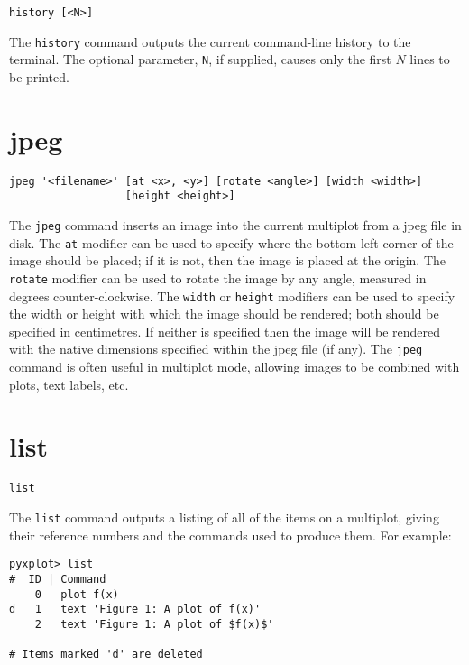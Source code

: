\begin{verbatim}
history [<N>]
\end{verbatim}

The {\tt history} command outputs the current command-line history to the
terminal.  The optional parameter, {\tt N}, if supplied, causes only the first
$N$ lines to be printed.

\section{jpeg}

\begin{verbatim}
jpeg '<filename>' [at <x>, <y>] [rotate <angle>] [width <width>]
                  [height <height>]
\end{verbatim}

The {\tt jpeg} command inserts an image into the current multiplot from a jpeg
file in disk.  The {\tt at} modifier can be used to specify where the
bottom-left corner of the image should be placed; if it is not, then the image
is placed at the origin. The {\tt rotate} modifier can be used to rotate the
image by any angle, measured in degrees counter-clockwise.  The {\tt width} or
{\tt height} modifiers can be used to specify the width or height with which
the image should be rendered; both should be specified in centimetres. If
neither is specified then the image will be rendered with the native dimensions
specified within the jpeg file (if any). The {\tt jpeg} command is often useful
in multiplot mode, allowing images to be combined with plots, text labels, etc.

\section{list}

\begin{verbatim}
list
\end{verbatim}

The {\tt list} command outputs a listing of all of the items on a multiplot,
giving their reference numbers and the commands used to produce them. For
example:

\begin{verbatim}
pyxplot> list
#  ID | Command 
    0   plot f(x) 
d   1   text 'Figure 1: A plot of f(x)' 
    2   text 'Figure 1: A plot of $f(x)$' 

# Items marked 'd' are deleted 
\end{verbatim}

